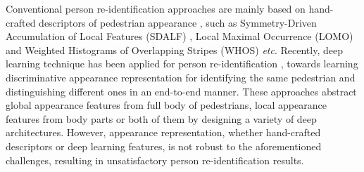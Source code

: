\documentclass[sigconf]{acmart}
\begin{document}
Conventional person re-identification approaches are mainly based on hand-crafted descriptors of pedestrian appearance \cite{41,43}, such as Symmetry-Driven Accumulation of Local Features (SDALF) \cite{1}, Local Maximal Occurrence (LOMO)~\cite{2} and Weighted Histograms of Overlapping Stripes (WHOS) \cite{54}\textit{etc}. Recently, deep learning technique has been applied for person re-identification \cite{46,47,48,50}, towards learning discriminative appearance representation for identifying the same pedestrian and distinguishing different ones in an end-to-end manner. These approaches abstract global appearance features from full body of pedestrians, local appearance features from body parts or both of them by designing a variety of deep architectures. However, appearance representation, whether hand-crafted descriptors or deep learning features, is not robust to the aforementioned challenges, resulting in unsatisfactory person re-identification results.
\end{document}
